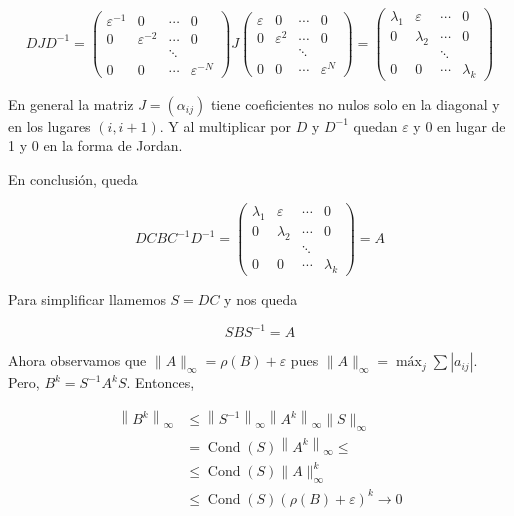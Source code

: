 \documentclass[10pt]{article}
\begin{document}
$$
D J D^{-1}=\left(\begin{array}{cccc}
\varepsilon^{-1} & 0 & \cdots & 0 \\
0 & \varepsilon^{-2} & \cdots & 0 \\
& & \ddots & \\
0 & 0 & \cdots & \varepsilon^{-N}
\end{array}\right) J\left(\begin{array}{cccc}
\varepsilon & 0 & \cdots & 0 \\
0 & \varepsilon^{2} & \cdots & 0 \\
& & \ddots & \\
0 & 0 & \cdots & \varepsilon^{N}
\end{array}\right)=\left(\begin{array}{cccc}
\lambda_{1} & \varepsilon & \cdots & 0 \\
0 & \lambda_{2} & \cdots & 0 \\
& & \ddots & \\
0 & 0 & \cdots & \lambda_{k}
\end{array}\right)
$$

En general la matriz $J=\left(\alpha_{i j}\right)$ tiene coeficientes no nulos solo en la diagonal y en los lugares $(i, i+1)$. Y al multiplicar por $D$ y $D^{-1}$ quedan $\varepsilon$ y 0 en lugar de 1 y 0 en la forma de Jordan.

En conclusión, queda

$$
D C B C^{-1} D^{-1}=\left(\begin{array}{cccc}
\lambda_{1} & \varepsilon & \cdots & 0 \\
0 & \lambda_{2} & \cdots & 0 \\
& & \ddots & \\
0 & 0 & \cdots & \lambda_{k}
\end{array}\right)=A
$$

Para simplificar llamemos $S=D C$ y nos queda

$$
S B S^{-1}=A
$$

Ahora observamos que $\|A\|_{\infty}=\rho(B)+\varepsilon$ pues $\|A\|_{\infty}=\operatorname{máx}_{j} \sum\left|a_{i j}\right|$.\\
Pero, $B^{k}=S^{-1} A^{k} S$. Entonces,

$$
\begin{aligned}
\left\|B^{k}\right\|_{\infty} & \leq\left\|S^{-1}\right\|_{\infty}\left\|A^{k}\right\|_{\infty}\|S\|_{\infty} \\
& =\operatorname{Cond}(S)\left\|A^{k}\right\|_{\infty} \leq \\
& \leq \operatorname{Cond}(S)\|A\|_{\infty}^{k} \\
& \leq \operatorname{Cond}(S)(\rho(B)+\varepsilon)^{k} \rightarrow 0
\end{aligned}
$$
\end{document}
